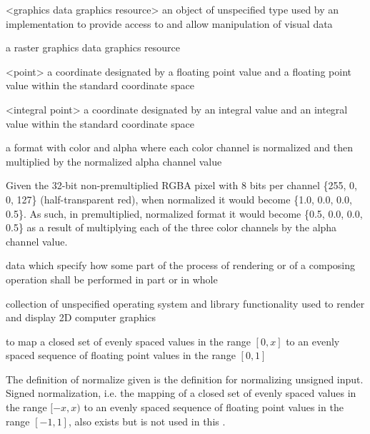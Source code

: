 <graphics data graphics resource> an object of unspecified type used by an implementation to provide access to and allow manipulation of visual data

\indexdefn{\pixmap}
a raster graphics data graphics resource

<point> a coordinate designated by a floating point \xaxis{} value and a floating point \yaxis{} value within the standard coordinate space

<integral point> a coordinate designated by an integral \xaxis{} value and an integral \yaxis{} value within the standard coordinate space

a format with color and alpha where each color channel is normalized and then 
multiplied by the normalized alpha channel value
\begin{example}
Given the 32-bit non-premultiplied RGBA pixel with 8 bits per channel \{255, 0, 
0, 127\} (half-transparent red), when normalized it would become \{1.0, 0.0, 
0.0, 0.5\}. As such, in premultiplied, normalized format it would become \{0.5, 
0.0, 0.0, 0.5\} as a result of multiplying each of the three color channels by 
the alpha channel value.
\end{example}

data which specify how some part of the process of rendering or of a composing operation shall be performed in part or in whole

collection of unspecified operating system and library functionality used to render and display 2D computer graphics

to map a closed set of evenly spaced values in the range $[0, x]$ to an evenly spaced sequence of floating point values in the range $[0, 1]$
\begin{note}
The definition of normalize given is the definition for normalizing unsigned input. Signed normalization, i.e. the mapping of a closed set of evenly spaced values in the range $[-x, x)$ to an evenly spaced sequence of floating point values in the range $[-1, 1]$, also exists but is not used in this \documenttypename{}.
\end{note}

